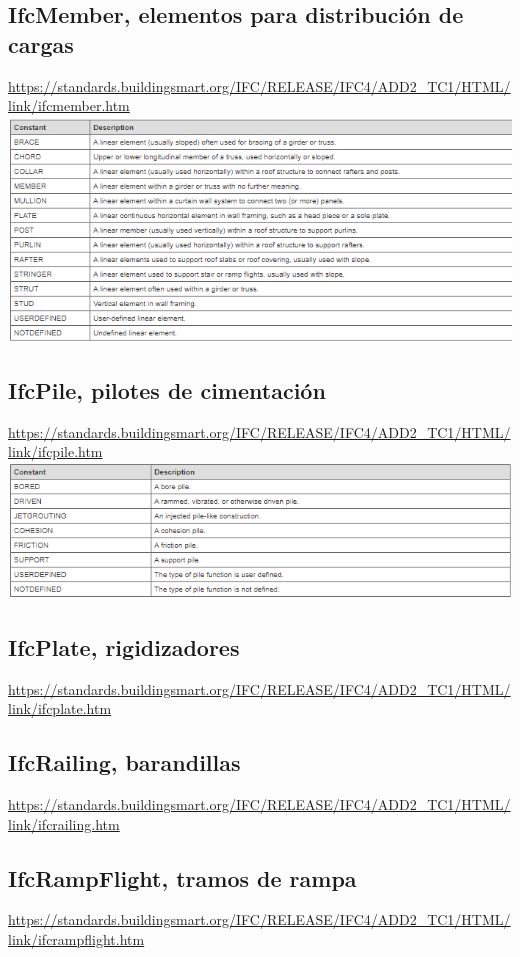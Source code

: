 \documentclass[spanish,12pt,a4paper,final,oneside]{book}
\begin{document}
\subsection{IfcMember, elementos para distribución de cargas}
\url{https://standards.buildingsmart.org/IFC/RELEASE/IFC4/ADD2_TC1/HTML/link/ifcmember.htm}
\\ \includegraphics[width=\textwidth]{Definicion de IfcMemberTypeEnum}

\subsection{IfcPile, pilotes de cimentación}
\url{https://standards.buildingsmart.org/IFC/RELEASE/IFC4/ADD2_TC1/HTML/link/ifcpile.htm}
\\ \includegraphics[width=\textwidth]{Definicion de IfcPileTypeEnum}

\subsection{IfcPlate, rigidizadores}
\url{https://standards.buildingsmart.org/IFC/RELEASE/IFC4/ADD2_TC1/HTML/link/ifcplate.htm}

\subsection{IfcRailing, barandillas}
\url{https://standards.buildingsmart.org/IFC/RELEASE/IFC4/ADD2_TC1/HTML/link/ifcrailing.htm}

\subsection{IfcRampFlight, tramos de rampa}
\url{https://standards.buildingsmart.org/IFC/RELEASE/IFC4/ADD2_TC1/HTML/link/ifcrampflight.htm}
\end{document}
